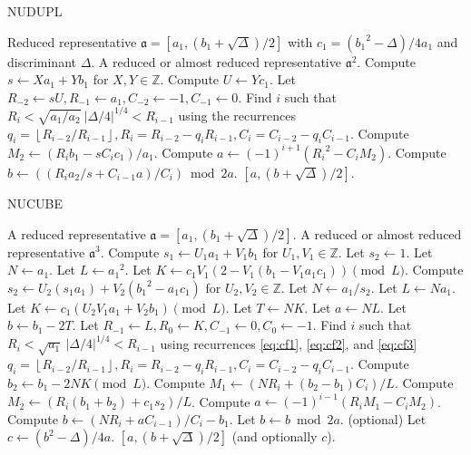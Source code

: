 \documentclass{ucalgthes1}
\theoremstyle{plain}
\theoremstyle{definition}
\newcommand{\ZZ}{\mathbb{Z}}
\newcommand{\floor}[1]{\left\lfloor #1 \right\rfloor}
\begin{document}
\begin{algorithm}[h]
\caption{NUDUPL}
\label{alg:nudupl}
\begin{algorithmic}[1]
\REQUIRE Reduced representative $\mathfrak a = [a_1, (b_1+\sqrt\Delta)/2]$ with $c_1 = ({b_1}^2-\Delta)/4a_1$ and discriminant $\Delta$.
\ENSURE A reduced or almost reduced representative $\mathfrak a^2$.
\STATE Compute $s \leftarrow Xa_1 + Yb_1$ for $X,Y \in \ZZ$.
\STATE Compute $U \leftarrow Yc_1$.
\STATE Let $R_{-2} \leftarrow sU, R_{-1} \leftarrow a_1, C_{-2} \leftarrow -1, C_{-1} \leftarrow 0$.
\STATE Find $i$ such that $R_i < \sqrt{a_1/a_2} ~ |\Delta/4|^{1/4} < R_{i-1}$ using the recurrences \break $q_i = \floor{R_{i-2}/R_{i-1}}, R_i = R_{i-2}-q_i R_{i-1}, C_i=C_{i-2}-q_i C_{i-1}$.
\STATE Compute $M_2 \leftarrow (R_i b_1 -sC_i c_1)/a_1$.
\STATE Compute $a \leftarrow (-1)^{i+1}({R_i}^2 - C_i M_2)$.
\STATE Compute $b \leftarrow ((R_i a_2/s + C_{i-1} a)/C_i) \bmod{2a}$.
\RETURN $[a, (b+\sqrt\Delta)/2]$.
\end{algorithmic}
\end{algorithm}

\begin{algorithm}[h]
\caption{NUCUBE}
\label{alg:nucube}
\begin{algorithmic}[1]
\REQUIRE A reduced representative $\mathfrak a = [a_1, (b_1+\sqrt\Delta)/2]$.
\ENSURE A reduced or almost reduced representative $\mathfrak a^3$.
\STATE Compute $s_1 \leftarrow U_1a_1 + V_1b_1$ for $U_1,V_1 \in \ZZ$.
	\STATE Let $s_2 \leftarrow 1$.
	\STATE Let $N \leftarrow a_1$.
	\STATE Let $L \leftarrow {a_1}^2$.
	\STATE Let $K \leftarrow c_1V_1(2-V_1(b_1-V_1a_1c_1)) \pmod L$.
\ELSE
	\STATE Compute $s_2 \leftarrow U_2(s_1a_1) + V_2({b_1}^2-a_1c_1)$ for $U_2, V_2 \in \ZZ$.
	\STATE Let $N \leftarrow a_1/s_2$.
	\STATE Let $L \leftarrow Na_1$.
	\STATE Let $K \leftarrow c_1(U_2V_1a_1+V_2b_1) \pmod L$.
\ENDIF
{}
	\STATE Let $T \leftarrow NK$.
	\STATE Let $a \leftarrow NL$.
	\STATE Let $b \leftarrow b_1 - 2T$.
\ELSE
	\STATE Let $R_{-1} \leftarrow L, R_0 \leftarrow K, C_{-1} \leftarrow 0, C_0 \leftarrow -1$.
	\STATE Find $i$ such that $R_i < \sqrt{a_1} ~ |\Delta/4|^{1/4} < R_{i-1}$ using recurrences \eqref{eq:cf1}, \eqref{eq:cf2}, and \eqref{eq:cf3} \break $q_i = \floor{R_{i-2}/R_{i-1}}, R_i = R_{i-2}-q_i R_{i-1}, C_i=C_{i-2}-q_i C_{i-1}$.
	\STATE Compute $b_2 \leftarrow b_1 -2NK \pmod L$.
	\STATE Compute $M_1 \leftarrow (NR_i + (b_2-b_1)C_i)/L$.
	\STATE Compute $M_2 \leftarrow (R_i(b_1+b_2)+c_1s_2)/L$.
	\STATE Compute $a \leftarrow (-1)^{i-1}(R_iM_1-C_iM_2)$.
	\STATE Compute $b \leftarrow (NR_i + aC_{i-1})/C_i-b_1$.
\ENDIF
\STATE Let $b \leftarrow b \bmod 2a$.
\STATE (optional) Let $c \leftarrow (b^2-\Delta)/4a$.
\RETURN $[a, (b+\sqrt\Delta)/2]$ (and optionally $c$).
\end{algorithmic}
\end{algorithm}
\end{document}
